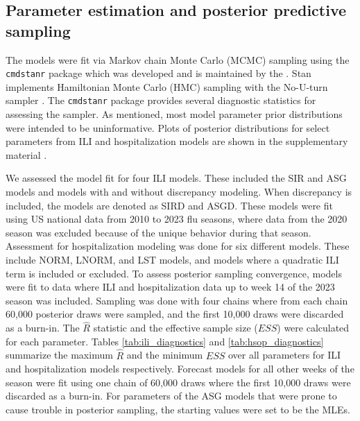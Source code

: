 \documentclass[ba]{imsart}
\theoremstyle{plain}
\theoremstyle{definition}
\theoremstyle{remark}
\begin{document}



 
   











\subsection{Parameter estimation and posterior predictive sampling}
\label{sec:implementation_posterior}

The models were fit via Markov chain Monte Carlo (MCMC) sampling using the \texttt{cmdstanr} package which was developed and is maintained by the \cite{stan2024manual} \cite[]{gabry2022stan}. Stan implements Hamiltonian Monte Carlo (HMC) sampling with the No-U-turn sampler \cite[]{hoffman2014no}. The \texttt{cmdstanr} package provides several diagnostic statistics for assessing the sampler.
As mentioned, most model parameter prior distributions were intended to be uninformative.
Plots of posterior distributions for select parameters from ILI and hospitalization models are shown in the supplementary material \cite[]{wadsworth2024bas}.

We assessed the model fit for four ILI models. These included the SIR and ASG models and models with and without discrepancy modeling. When discrepancy is included, the models are denoted as SIRD and ASGD. These models were fit using US national data from 2010 to 2023 flu seasons, where data from the 2020 season was excluded because of the unique behavior during that season. Assessment for hospitalization modeling was done for six different models. These include NORM, LNORM, and LST models, and models where a quadratic ILI term is included or excluded. To assess posterior sampling convergence, models were fit to data where ILI and hospitalization data up to week 14 of the 2023 season was included. Sampling was done with four chains where from each chain 60,000 posterior draws were sampled, and the first 10,000 draws were discarded as a burn-in. The $\hat{R}$ statistic \cite[]{vehtari2021rank} and the effective sample size ($ESS$) \cite[]{gelman2013bayesian} were calculated for each parameter. Tables \ref{tab:ili_diagnostics} and \ref{tab:hsop_diagnostics} summarize the maximum $\hat{R}$ and the minimum $ESS$ over all parameters for ILI and hospitalization models respectively. Forecast models for all other weeks of the season were fit using one chain of 60,000 draws where the first 10,000 draws were discarded as a burn-in. 
For parameters of the ASG models that were prone to cause trouble in posterior sampling, the starting values were set to be the MLEs. 
\end{document}
